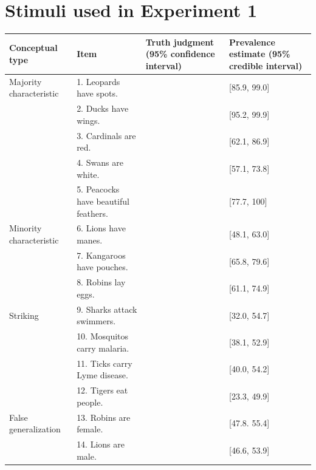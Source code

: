 \documentclass[10pt,letterpaper]{article}
\begin{document}
\section{Stimuli used in Experiment 1}
\label{sec:appendix}	

\begin{table}[h]
\begin{tabular}{| l | l | p{2.5cm} | p{3.5cm} |}
\hline
Conceptual type & Item & Truth judgment  (95\% confidence interval)& Prevalence estimate  (95\% credible interval) \\
\hline \hline
Majority characteristic       & 1. Leopards have spots.    &                & [85.9, 99.0]\\
                                          & 2. Ducks have wings.                       &                &[95.2, 99.9]\\
                                          & 3. Cardinals are red.                       &                &[62.1, 86.9]\\
                                          & 4. Swans are white.                       &                & [57.1, 73.8] \\
                                          & 5. Peacocks have beautiful feathers. &  & [77.7, 100] \\
Minority characteristic       & 6. Lions have manes.       &                & [48.1, 63.0]\\
                                          & 7. Kangaroos have pouches.                        && [65.8, 79.6]\\
                                          & 8. Robins lay eggs.                        &                & [61.1, 74.9]\\
Striking                      & 9. Sharks attack swimmers. &                & [32.0, 54.7]\\
                                  & 10. Mosquitos carry malaria.                        &                &[38.1,	 52.9]\\
                                  & 11. Ticks carry Lyme disease.                        &                & [40.0, 54.2]\\
                                  & 12. Tigers eat people.                        &                & [23.3, 49.9]\\
False generalization & 13. Robins are female.      &                & [47.8. 55.4]\\
                                              & 14.  Lions are male.                       &                &[46.6, 53.9]\\

\end{tabular}
\end{table}
\end{document}
